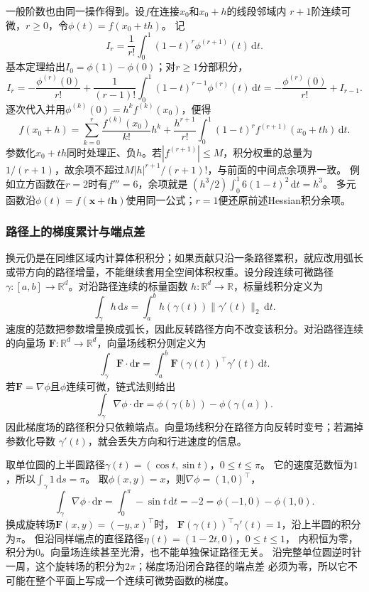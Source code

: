 一般阶数也由同一操作得到。设$f$在连接$x_0$和$x_0+h$的线段邻域内
$r+1$阶连续可微，$r\geq0$，令$\phi(t)=f(x_0+th)$。
记
\[
 I_r=\frac1{r!}\int_0^1(1-t)^r\phi^{(r+1)}(t)\,\mathrm dt.
\]
基本定理给出$I_0=\phi(1)-\phi(0)$；对$r\geq1$分部积分，
\[
 I_r=-\frac{\phi^{(r)}(0)}{r!}
       +\frac1{(r-1)!}\int_0^1(1-t)^{r-1}\phi^{(r)}(t)\,\mathrm dt
     =-\frac{\phi^{(r)}(0)}{r!}+I_{r-1}.
\]
逐次代入并用$\phi^{(k)}(0)=h^k f^{(k)}(x_0)$，便得
\begin{equation}
 f(x_0+h)=\sum_{k=0}^r\frac{f^{(k)}(x_0)}{k!}h^k
 +\frac{h^{r+1}}{r!}
   \int_0^1(1-t)^r f^{(r+1)}(x_0+th)\,\mathrm dt.
\label{eq:analysis-taylor-integral-remainder}
\end{equation}
参数化$x_0+th$同时处理正、负$h$。若$|f^{(r+1)}|\leq M$，积分权重的总量为
$1/(r+1)$，故余项不超过$M|h|^{r+1}/(r+1)!$，与前面的中间点余项界一致。
例如立方函数在$r=2$时有$f'''=6$，余项就是
$(h^3/2)\int_0^1 6(1-t)^2\,\mathrm dt=h^3$。
多元函数沿$\phi(t)=f(\bm x+t\bm h)$使用同一公式；$r=1$便还原前述Hessian积分余项。

\subsubsection{路径上的梯度累计与端点差}

换元仍是在同维区域内计算体积积分；如果贡献只沿一条路径累积，就应改用弧长或带方向的路径增量，不能继续套用全空间体积权重。设分段连续可微路径$\gamma:[a,b]\to\mathbb{R}^d$。对沿路径连续的标量函数
$h:\mathbb{R}^d\to\mathbb{R}$，标量线积分定义为
\[
  \int_\gamma h\,\mathrm{d}s
  =
  \int_a^b h(\gamma(t))\lVert\gamma'(t)\rVert_2\,\mathrm{d}t.
\]
速度的范数把参数增量换成弧长，因此反转路径方向不改变该积分。对沿路径连续的向量场
$\bm{F}:\mathbb{R}^d\to\mathbb{R}^d$，向量场线积分则定义为
\[   \int_{\gamma}\bm{F}\mathbin{\cdot}\mathrm{d}\bm{r}   =   \int_a^b   \bm{F}(\gamma(t))^{\top}\gamma'(t)\,\mathrm{d}t. \]
若$\bm{F}=\nabla\phi$且$\phi$连续可微，链式法则给出
\begin{equation}
  \int_{\gamma}\nabla\phi\mathbin{\cdot}\mathrm{d}\bm{r}
  =
  \phi(\gamma(b))-\phi(\gamma(a)).
\label{eq:analysis-line-integral-gradient}
\end{equation}
因此梯度场的路径积分只依赖端点。向量场线积分在路径方向反转时变号；若漏掉参数化导数
$\gamma'(t)$，就会丢失方向和行进速度的信息。

\begin{example}
\label{ex:analysis-path-integral-comparison}
取单位圆的上半圆路径$\gamma(t)=(\cos t,\sin t)$，$0\leq t\leq\pi$。
它的速度范数恒为$1$，所以$\int_\gamma1\,\mathrm ds=\pi$。
取$\phi(x,y)=x$，则$\nabla\phi=(1,0)^\top$，
\[
 \int_\gamma\nabla\phi\mathbin{\cdot}\mathrm d\bm r
 =\int_0^\pi-\sin t\,\mathrm dt=-2
 =\phi(-1,0)-\phi(1,0).
\]
换成旋转场$\bm F(x,y)=(-y,x)^\top$时，
$\bm F(\gamma(t))^\top\gamma'(t)=1$，沿上半圆的积分为$\pi$。
但沿同样端点的直径路径$\eta(t)=(1-2t,0)$，$0\leq t\leq1$，
内积恒为零，积分为$0$。向量场连续甚至光滑，也不能单独保证路径无关。
沿完整单位圆逆时针一周，这个旋转场的积分为$2\pi$；梯度场沿闭合路径的端点差
必须为零，所以它不可能在整个平面上写成一个连续可微势函数的梯度。
\end{example}

